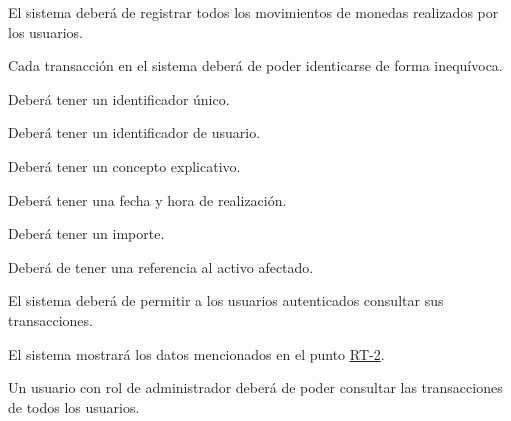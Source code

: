 

\begin{RFTransacciones}
	\item El sistema deberá de registrar todos los movimientos de monedas realizados por los usuarios.
	\item Cada transacción en el sistema deberá de poder identicarse de forma inequívoca. \hypertarget{RT-2}{}
	\begin{RFTransacciones}
		\item Deberá tener un identificador único.
		\item Deberá tener un identificador de usuario.
		\item Deberá tener un concepto explicativo.
		\item Deberá tener una fecha y hora de realización.
		\item Deberá tener un importe.
		\item Deberá de tener una referencia al activo afectado.
	\end{RFTransacciones}
	\item El sistema deberá de permitir a los usuarios autenticados consultar sus transacciones.
	\begin{RFTransacciones}
		\item El sistema mostrará los datos mencionados en el punto \hyperlink{RT-2}{RT-2}.
	\end{RFTransacciones}
	\item Un usuario con rol de administrador deberá de poder consultar las transacciones de todos los usuarios.	
\end{RFTransacciones}